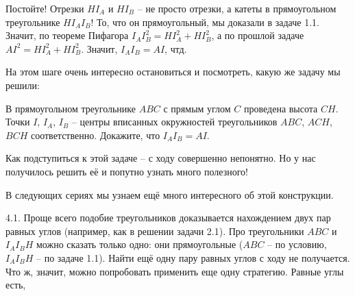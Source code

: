 Постойте! Отрезки $HI_A$ и $HI_B$ -- не просто отрезки, а катеты в прямоугольном треугольнике $HI_AI_B$! То, что он прямоугольный, мы доказали в задаче 1.1. Значит, по теореме Пифагора $I_AI_B^2 = HI_A^2 + HI_B^2$, а по прошлой задаче $AI^2 = HI_A^2 + HI_B^2$. Значит, $I_AI_B = AI$, чтд.

На этом шаге очень интересно остановиться и посмотреть, какую же задачу мы решили:

В прямоугольном треугольнике $ABC$ с прямым углом $C$ проведена высота $CH$. Точки $I$, $I_A$, $I_B$ -- центры вписанных окружностей треугольников $ABC$, $ACH$, $BCH$ соответственно. Докажите, что $I_AI_B = AI$.

Как подступиться к этой задаче -- с ходу совершенно непонятно. Но у нас получилось решить её и попутно узнать много полезного!

В следующих сериях мы узнаем ещё много интересного об этой конструкции.

4.1. Проще всего подобие треугольников доказывается нахождением двух пар равных углов (например, как в решении задачи 2.1). Про треугольники $ABC$ и $I_AI_BH$ можно сказать только одно: они прямоугольные ($ABC$ -- по условию, $I_AI_BH$ -- по задаче 1.1). Найти ещё одну пару равных углов с ходу не получается. Что ж, значит, можно попробовать применить еще одну стратегию. Равные углы есть,   
